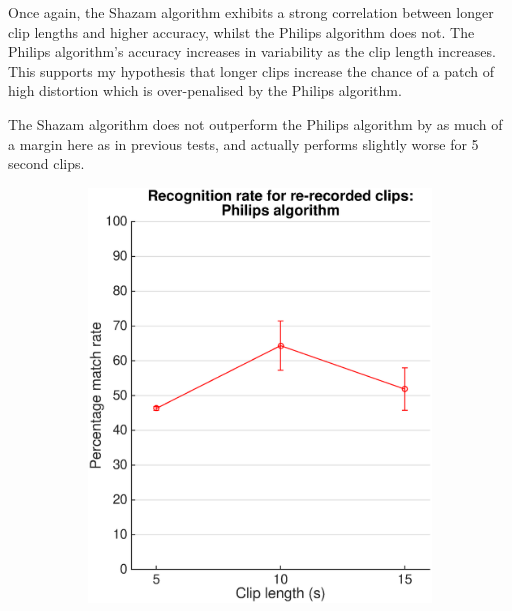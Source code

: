 \documentclass[12pt,a4paper,twoside,openright]{report}
\begin{document}
Once again, the Shazam algorithm exhibits a strong correlation between longer clip lengths and higher accuracy, whilst the Philips algorithm does not. The Philips algorithm's accuracy increases in variability as the clip length increases. This supports my hypothesis that longer clips increase the chance of a patch of high distortion which is over-penalised by the Philips algorithm.

The Shazam algorithm does not outperform the Philips algorithm by as much of a margin here as in previous tests, and actually performs slightly worse for 5 second clips. 

\begin{figure}[htbp!]
    \centering

    \begin{subfigure}{0.5\textwidth}
    	\centering
     	\includegraphics[width=0.95\linewidth]{./figs/barcoder_passthrough.eps}
    \end{subfigure}%
    ~
    \begin{subfigure}{0.5\textwidth}
    	\centering

\end{subfigure}
\end{figure}
\end{document}
